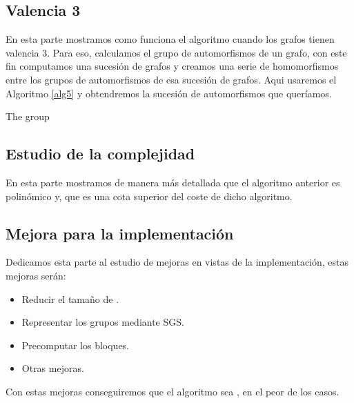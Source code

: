 \documentclass[12pt,a4paper]{book}
\theoremstyle{plain}
\theoremstyle{definition}
\theoremstyle{remark}
\begin{document}
\begin{center}
\subsection*{Valencia 3}
En esta parte mostramos como funciona el algoritmo cuando los grafos tienen valencia 3. Para eso,   calculamos  el 
grupo de automorfismos de un grafo, con este fin computamos  una sucesión de grafos y creamos una serie de homomorfismos entre 
los grupos de automorfismos de esa sucesión de grafos. Aqui usaremos el Algoritmo \ref{alg5} y obtendremos la sucesión de 
automorfismos que queríamos.

\begin{algorithm}\label{alg5}\hypertarget{alg5}{}
\Begin{

\For{}{
	 \Ker()\\
	 \Image() \\
	 \Pullback()\\
	
    }
\Return{}
}
\caption{The group }

\end{algorithm}
 
 \subsection*{Estudio de la complejidad}
 En esta parte mostramos de manera más detallada que el algoritmo anterior es polinómico y, que  es una 
 cota superior del coste de dicho algoritmo.
 
 \subsection*{Mejora para la implementación}
Dedicamos esta parte al  estudio de mejoras en vistas de la implementación, estas mejoras serán:
 
 \begin{itemize}
  \item Reducir el tamaño de .
  \item Representar los grupos mediante SGS.
  \item Precomputar los bloques.
  \item Otras mejoras.
 \end{itemize}
Con estas mejoras conseguiremos que el algoritmo sea , en el peor de los casos.


\end{center}
\end{document}
